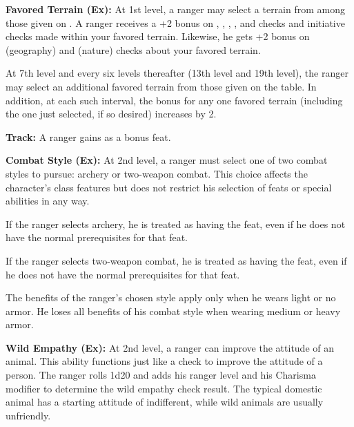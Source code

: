 

\textbf{Favored Terrain (Ex):} At 1st level, a ranger may select a terrain from among those given on . A ranger receives a +2 bonus on , , , ,  and  checks and initiative checks made within your favored terrain. Likewise, he gets +2 bonus on  (geography) and  (nature) checks about your favored terrain.

At 7th level and every six levels thereafter (13th level and 19th level), the ranger may select an additional favored terrain from those given on the table. In addition, at each such interval, the bonus for any one favored terrain (including the one just selected, if so desired) increases by 2.


\textbf{Track:} A ranger gains  as a bonus feat.


\textbf{Combat Style (Ex):} At 2nd level, a ranger must select one of two combat styles to pursue: archery or two-weapon combat. This choice affects the character's class features but does not restrict his selection of feats or special abilities in any way.

If the ranger selects archery, he is treated as having the  feat, even if he does not have the normal prerequisites for that feat.

If the ranger selects two-weapon combat, he is treated as having the  feat, even if he does not have the normal prerequisites for that feat.

The benefits of the ranger's chosen style apply only when he wears light or no armor. He loses all benefits of his combat style when wearing medium or heavy armor.


\textbf{Wild Empathy (Ex):} At 2nd level, a ranger can improve the attitude of an animal. This ability functions just like a  check to improve the attitude of a person. The ranger rolls 1d20 and adds his ranger level and his Charisma modifier to determine the wild empathy check result. The typical domestic animal has a starting attitude of indifferent, while wild animals are usually unfriendly.

